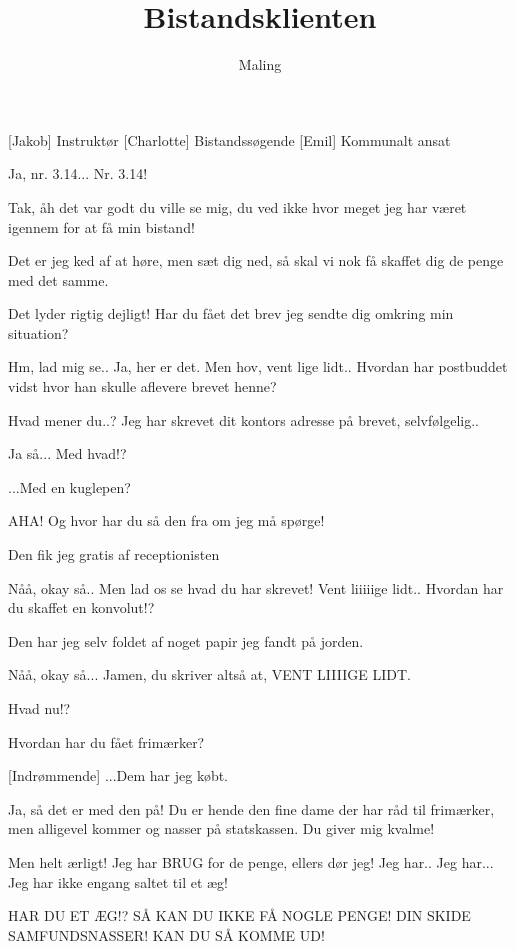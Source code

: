 \documentclass[a4paper,11pt]{article}
\title{Bistandsklienten}
\author{Maling}
\begin{document}
\maketitle

\begin{roles}
[Jakob] Instruktør
[Charlotte] Bistandssøgende 
[Emil] Kommunalt ansat
\end{roles}

\begin{sketch}

 Ja, nr. 3.14...  Nr. 3.14!

 Tak, åh det var godt du ville se mig, du ved ikke hvor meget jeg har været igennem for at få min bistand!

 Det er jeg ked af at høre, men sæt dig ned, så skal vi nok få skaffet dig de penge med det samme.

 Det lyder rigtig dejligt! Har du fået det brev jeg sendte dig omkring min situation?

 Hm, lad mig se.. Ja, her er det. Men hov, vent lige lidt.. Hvordan har postbuddet vidst hvor han skulle aflevere brevet henne?

 Hvad mener du..? Jeg har skrevet dit kontors adresse på brevet, selvfølgelig..

 Ja så... Med hvad!?

 ...Med en kuglepen?

 AHA! Og hvor har du så den fra om jeg må spørge!

 Den fik jeg gratis af receptionisten

 Nåå, okay så.. Men lad os se hvad du har skrevet! Vent liiiiige lidt.. Hvordan har du skaffet en konvolut!?

 Den har jeg selv foldet af noget papir jeg fandt på jorden.

 Nåå, okay så... Jamen, du skriver altså at, VENT LIIIIGE LIDT.

 Hvad nu!?

 Hvordan har du fået frimærker?

[Indrømmende] ...Dem har jeg købt.

 Ja, så det er med den på! Du er hende den fine dame der har råd til frimærker, men alligevel kommer og nasser på statskassen. Du giver mig kvalme!

 Men helt ærligt! Jeg har BRUG for de penge, ellers dør jeg! Jeg har.. Jeg har... Jeg har ikke engang saltet til et æg!

 HAR DU ET ÆG!? SÅ KAN DU IKKE FÅ NOGLE PENGE! DIN SKIDE SAMFUNDSNASSER! KAN DU SÅ KOMME UD!

\end{sketch}
\end{document}
